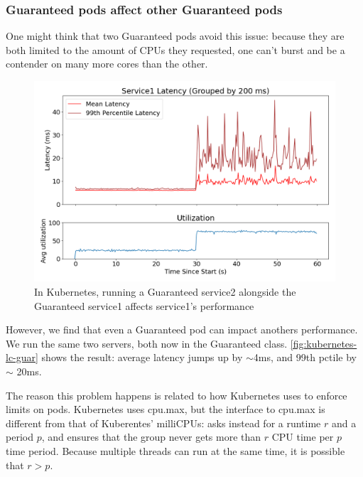 \subsubsection{Guaranteed pods affect other Guaranteed pods}

One might think that two Guaranteed pods avoid this issue: because they are both
limited to the amount of CPUs they requested, one can't burst and be a contender
on many more cores than the other.

\begin{figure}[t]
    \centering
    \includegraphics[width=\columnwidth]{graphs/kubernetes-lc-guar.png}
    \caption{In Kubernetes, running a Guaranteed service2 alongside the
    Guaranteed service1 affects service1's
    performance}\label{fig:kubernetes-lc-guar}
\end{figure}

However, we find that even a Guaranteed pod can impact anothers performance. We
run the same two servers, both now in the Guaranteed class.
\autoref{fig:kubernetes-lc-guar} shows the result: average latency jumps up by
$\sim$4ms, and 99th pctile by $\sim$ 20ms.

The reason this problem happens is related to how Kubernetes uses \cgroups{} to
enforce limits on pods. Kubernetes uses cpu.max, but the interface to \cgroups{}
cpu.max is different from that of Kuberentes' milliCPUs: \cgroups{} asks instead
for a runtime $r$ and a period $p$, and ensures that the group never gets more
than $r$ CPU time per $p$ time period. Because multiple threads can run at the
same time, it is possible that $r>p$.

